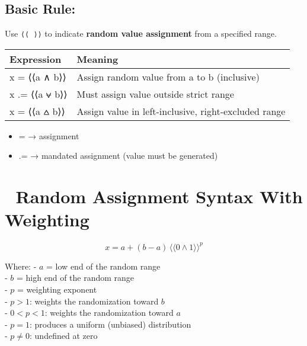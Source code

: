 \documentclass[
  letterpaper,
]{book}
\providecommand{\tightlist}{%
  \setlength{\itemsep}{0pt}\setlength{\parskip}{0pt}}
\begin{document}
\subsection{Basic Rule:}\label{basic-rule}

Use \texttt{⟨⟨\ ⟩⟩} to indicate \textbf{random value assignment} from a
specified range.

\begin{longtable}[]{@{}
  >{\raggedright\arraybackslash}p{}
  >{\raggedright\arraybackslash}p{}@{}}
\toprule\noalign{}
\begin{minipage}[b]{\linewidth}\raggedright
Expression
\end{minipage} & \begin{minipage}[b]{\linewidth}\raggedright
Meaning
\end{minipage} \\
\midrule\noalign{}
\endhead
\bottomrule\noalign{}
\endlastfoot
x = ⟨⟨a ∧ b⟩⟩ & Assign random value from a to b (inclusive) \\
x .= ⟨⟨a ⩝ b⟩⟩ & Must assign value outside strict range \\
x = ⟨⟨a ⩟ b⟩⟩ & Assign value in left-inclusive, right-excluded range \\
\end{longtable}

\begin{itemize}
\tightlist
\item
  = → assignment
\item
  .= → mandated assignment (value must be generated)
\end{itemize}

\section{🎲 Random Assignment Syntax With
Weighting}\label{random-assignment-syntax-with-weighting}

\[
x = a + (b - a)\,⟨⟨0 ∧ 1⟩⟩^{p}
\]

Where: - \(a\) = low end of the random range\\
- \(b\) = high end of the random range\\
- \(p\) = weighting exponent\\
- \(p > 1\): weights the randomization toward \(b\)\\
- \(0 < p < 1\): weights the randomization toward \(a\)\\
- \(p = 1\): produces a uniform (unbiased) distribution\\
- \(p \neq 0\): undefined at zero
\end{document}
